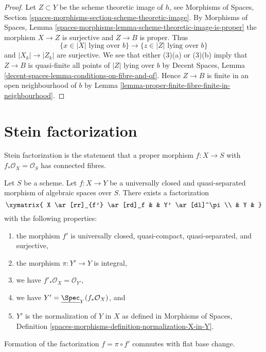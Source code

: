 \begin{proof}
Let $Z \subset Y$ be the scheme theoretic image of $h$, see
Morphisms of Spaces, Section
\ref{spaces-morphisms-section-scheme-theoretic-image}.
By Morphisms of Spaces, Lemma
\ref{spaces-morphisms-lemma-scheme-theoretic-image-is-proper}
the morphism $X \to Z$ is surjective and $Z \to B$ is proper.
Thus
$$
\{x \in |X|\text{ lying over }b\} \to
\{z \in |Z|\text{ lying over }b\}
$$
and $|X_k| \to |Z_k|$ are surjective. We see that either
(3)(a) or (3)(b) imply that $Z \to B$ is quasi-finite
all points of $|Z|$ lying over $b$ by
Decent Spaces, Lemma \ref{decent-spaces-lemma-conditions-on-fibre-and-qf}.
Hence $Z \to B$ is finite in an open neighbourhood of $b$ by
Lemma \ref{lemma-proper-finite-fibre-finite-in-neighbourhood}.
\end{proof}







\section{Stein factorization}
\label{section-stein-factorization}

\noindent
Stein factorization is the statement that a proper morphism $f : X \to S$
with $f_*\mathcal{O}_X = \mathcal{O}_S$ has connected fibres.

\begin{lemma}
\label{lemma-stein-universally-closed}
Let $S$ be a scheme. Let $f : X \to Y$ be a universally closed and
quasi-separated morphism of algebraic spaces over $S$.
There exists a factorization
$$
\xymatrix{
X \ar[rr]_{f'} \ar[rd]_f & & Y' \ar[dl]^\pi \\
& Y &
}
$$
with the following properties:
\begin{enumerate}
\item the morphism $f'$ is universally closed, quasi-compact, quasi-separated,
and surjective,
\item the morphism $\pi : Y' \to Y$ is integral,
\item we have $f'_*\mathcal{O}_X = \mathcal{O}_{Y'}$,
\item we have $Y' = \underline{\Spec}_Y(f_*\mathcal{O}_X)$, and
\item $Y'$ is the normalization of $Y$ in $X$ as defined in
Morphisms of Spaces, Definition
\ref{spaces-morphisms-definition-normalization-X-in-Y}.
\end{enumerate}
Formation of the factorization $f = \pi \circ f'$ commutes with flat
base change.
\end{lemma}

